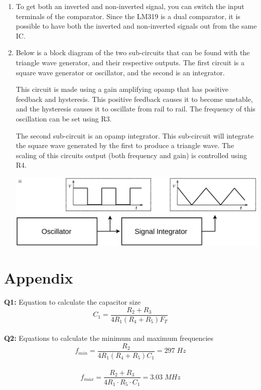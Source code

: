 \documentclass[a4paper,11pt]{article}
\begin{document}
\begin{preview}
\begin{enumerate}
    
    \item To get both an inverted and non-inverted signal, you can switch the input terminals of the comparator. Since the LM319 is a dual comparator, it is possible to have both the inverted and non-inverted signals out from the same IC. \\
    

    \item 

    Below is a block diagram of the two sub-circuits that can be found with the triangle wave generator, and their respective outputs. The first circuit is a square wave generator or oscillator, and the second is an integrator. 
    
    This circuit is made using a gain amplifying opamp that has positive feedback and hysteresis. This positive feedback causes it to become unstable, and the hysteresis causes it to oscillate from rail to rail. The frequency of this oscillation can be set using R3. 

    The second sub-circuit is an opamp integrator. This sub-circuit will integrate the square wave generated by the first to produce a triangle wave. The scaling of this circuits output (both frequency and gain) is controlled using R4. 
    
    \begin{center}
        \includegraphics[width = 1\textwidth]{block_diagram.png}
    \end{center}
    \vspace{10pt}


\end{enumerate}

\section*{Appendix}

\textbf{Q1:} Equation to calculate the capacitor size
$$ C_{1}=\frac{R_{2}+R_{3}}{4R_{1}\left(R_{4}+R_{5}\right)F_{T}} $$\\

\textbf{Q2:} Equations to calculate the minimum and maximum frequencies
$$ f_{min}=\frac{R_{2}}{4R_{1}\left(R_{4}+R_{5}\right)C_{1}} = 297\;Hz $$ \\
$$ f_{max}=\frac{R_{2}+R_{3}}{4R_{1}\cdot R_{5}\cdot C_{1}} = 3.03\;MHz $$\\


\end{preview}
\end{document}
